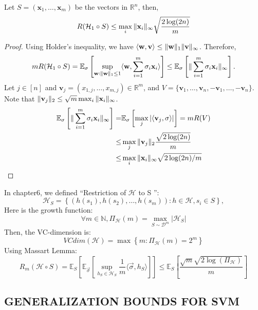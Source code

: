 \begin{lemma}
    Let $ S = ( \mathbf{x}_1, \ldots, \mathbf{x}_m ) $ be the vectors in $ \mathbb{R}^n $, then,
    \begin{equation}
        R( \mathcal{H}_1 \circ S) \le \max_i \Arrowvert \mathbf{x}_i \Arrowvert_\infty
        \sqrt{\frac{2\log(2n)}{m}}
    \end{equation}
    \begin{proof}
        Using Holder's inequality, we have $ \langle \mathbf{w}, \mathbf{v} \rangle \le \Arrowvert \mathbf{w} \Arrowvert_1 \Arrowvert \mathbf{v} \Arrowvert_\infty$. Therefore,
        \begin{align*}
            mR( \mathcal{H}_1 \circ S )
            = \mathbb{E}_\sigma \left[ \sup_{\mathbf{w}:\Arrowvert \mathbf{w} \Arrowvert_1 \le 1} \langle \mathbf{w}, \sum^{m}_{i=1} \sigma_i \mathbf{x}_i \rangle \right]
            \le \mathbb{E}_\sigma \left[ \Arrowvert \sum^{m}_{i=1} \sigma_i \mathbf{x}_i \Arrowvert_\infty \right].
        \end{align*}
        Let $ j \in [n] $ and $ \mathbf{v}_j = ( x_{1,j}, \ldots, x_{m,j}) \in \mathbb{R}^m $,
        and $ V = \{ \mathbf{v}_1, \ldots, \mathbf{v}_n, - \mathbf{v}_1, \ldots, - \mathbf{v}_n \} $.
        Note that $ \Arrowvert \mathbf{v}_j \Arrowvert_2 \le \sqrt{m} \max_i \Arrowvert \mathbf{x}_i \Arrowvert_\infty $.
        \begin{align*}
            \mathbb{E}_\sigma \left[ \Arrowvert \sum^{m}_{i=1} \sigma_i \mathbf{x}_i \Arrowvert_\infty \right]
            =& \mathbb{E}_\sigma \left[ \max_j | \langle \mathbf{v}_j, \sigma \rangle | \right]
            = m R(V) \\
            \le& \max_j \Arrowvert \mathbf{v}_j \Arrowvert_2 \frac{\sqrt{2\log(2n)}}{m} \\
            \le& \max_i \Arrowvert \mathbf{x}_i \Arrowvert_\infty \sqrt{2\log(2n)/m}
        \end{align*}
    \end{proof}
\end{lemma}

In chapter6, we defined ``Restriction of $ \mathcal{H} $ to S '':
\[
    \mathcal{H}_S = \left\{ (h(s_1), h(s_2), \ldots, h(s_m)) : h \in \mathcal{H}, s_i \in S\right\},
\]
Here is the growth function:
\[
    \forall m \in \mathbb{N}, \Pi_{ \mathcal{H}} (m) = \max_{S \sim \mathcal{D}^m} \left| \mathcal{H}_S \right|
\]
Then, the VC-dimension is:
\[
    VCdim( \mathcal{H}) = \max \left\{ m: \Pi_ \mathcal{H}(m) = 2^m \right\}
\]
Using Massart Lemma:
\[
    R_m(\mathcal{H} \circ S) = \mathbb{E}_S \left[ \mathbb{E}_{\vec{\sigma} } \left[ \sup_{h_S \in \mathcal{H}_S} \frac{1}{m} \langle \vec{\sigma}, h_S \rangle \right] \right] \le \mathbb{E}_S \left[ \frac{\sqrt{m} \sqrt{2 \log (\Pi_{\mathcal{H}})}}{m}  \right]
\]

\subsection{GENERALIZATION BOUNDS FOR SVM}%
\label{sub:generalization_bounds_for_svm}


